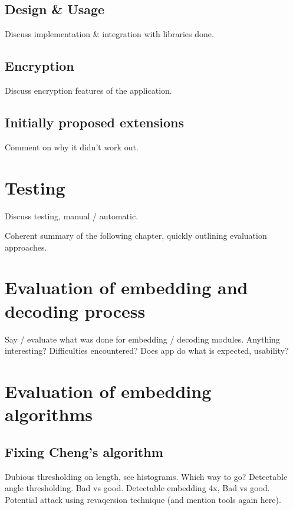 \documentclass[12pt,british,twoside,notitlepage,usenames,dvipsnames,hypens,final]{report}
\numberwithin{equation}{section}
\numberwithin{figure}{section}
\begin{document}
\subsection{Design \& Usage}

Discuss implementation \& integration with libraries done.

\subsection{Encryption}
Discuss encryption features of the application.

\subsection{Initially proposed extensions}
Comment on why it didn't work out.


\section{Testing}

Discuss testing, manual / automatic.


Coherent summary of the following chapter, quickly outlining evaluation approaches.

\section{Evaluation of embedding and decoding process}

Say / evaluate what was done for embedding / decoding modules. Anything interesting? Difficulties encountered? Does app do what is expected, usability?

\section{Evaluation of embedding algorithms}

\subsection{Fixing Cheng's algorithm}

Dubious thresholding on length, see histograms. Which way to go?
Detectable angle thresholding. Bad vs good.
Detectable embedding 4x, Bad vs good.
Potential attack using revaqersion technique (and mention tools again here).
\end{document}
